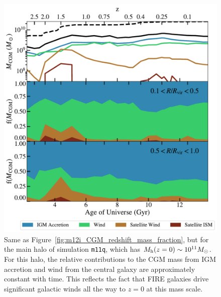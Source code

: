 \documentclass[fleqn,usenatbib]{mnras}
\begin{document}
\begin{figure}
\includegraphics[width=\columnwidth]{figures/m11q_CGM_redshift_mass_fraction_galdefv3}
\caption{
Same as Figure~\ref{fig:m12i_CGM_redshift_mass_fraction}, but for the main halo of simulation \texttt{m11q}, which has  $M_{\rm h} ( z=0 )\sim 10^{11} M_\odot$.
For this halo, the relative contributions to the CGM mass from IGM accretion and wind from the central galaxy are approximately constant with time. 
This reflects the fact that FIRE galaxies drive significant galactic winds all the way to $z=0$ at this mass scale.
}
\label{fig:m11q_CGM_redshift_mass_fraction}
\end{figure}
\end{document}
